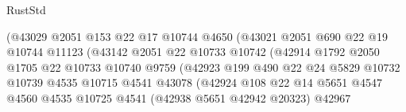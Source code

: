 \begin{lexlean}{RustStd}
\begin{coremodule}
{\begin{coremodule}
{{{{{{{{{{{{{{{{{{{{{{{{{{{{{{{{{{{{{{{{{{{{{{{{{{{{{{{                                      (@43029
                                        @2051
                                        @153
                                        @22
                                        @17
                                        @10744
                                        @4650
                                        (@43021
                                          @2051
                                          @690
                                          @22
                                          @19
                                          @10744
                                          @11123
                                          (@43142
                                            @2051
                                            @22
                                            @10733
                                            @10742
                                            (@42914
                                              @1792
                                              @2050
                                              @1705
                                              @22
                                              @10733
                                              @10740
                                              @9759
                                              (@42923
                                                @199
                                                @490
                                                @22
                                                @24
                                                @5829
                                                @10732
                                                @10739
                                                @4535
                                                @10715
                                                @4541
                                                @43078
                                                (@42924
                                                  @108
                                                  @22
                                                  @14
                                                  @5651
                                                  @4547
                                                  @4560
                                                  @4535
                                                  @10725
                                                  @4541
                                                  (@42938 @5651 @42942 @20323)
                                                  @42967
}}}}}}}}}}}}}}}}}}}}}}}}}}}}}}}}}}}}}}}}}}}}}}}}}}}}}}}
\end{coremodule}}
\end{coremodule}
\end{lexlean}
